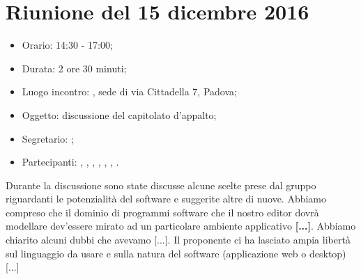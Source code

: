 \section{Riunione del 15 dicembre 2016}

\begin{itemize}
	\item Orario: 14:30 - 17:00;
	\item Durata: 2 ore 30 minuti;
	\item Luogo incontro: \ZU, sede di via Cittadella 7, Padova; 
	\item Oggetto: discussione del capitolato d'appalto;
	\item Segretario: \LS; 
	\item Partecipanti: \GP, \AZ, \GG, \LB, \LS, \MM, \PB.
\end{itemize}

Durante la discussione sono state discusse alcune scelte prese dal gruppo riguardanti le potenzialità del software e suggerite altre di nuove. Abbiamo compreso che il dominio di programmi software che il nostro editor dovrà modellare dev'essere mirato ad un particolare ambiente applicativo \textbf{[...]}. Abbiamo chiarito alcuni dubbi che avevamo [...]. Il proponente ci ha lasciato ampia libertà sul linguaggio da usare e sulla natura del software (applicazione web o desktop)[...]


